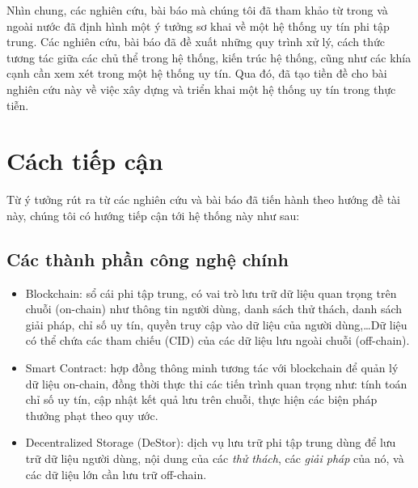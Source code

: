 Nhìn chung, các nghiên cứu, bài báo mà chúng tôi đã tham khảo từ trong và ngoài nước đã định hình một ý tưởng sơ khai về một hệ thống uy tín phi tập trung. Các nghiên cứu, bài báo đã đề xuất những quy trình xử lý, cách thức tương tác giữa các chủ thể trong hệ thống, kiến trúc hệ thống, cũng như các khía cạnh cần xem xét trong một hệ thống uy tín. Qua đó, đã tạo tiền đề cho bài nghiên cứu này về việc xây dựng và triển khai một hệ thống uy tín trong thực tiễn.

\section{Cách tiếp cận}

Từ ý tưởng rút ra từ các nghiên cứu và bài báo đã tiến hành theo hướng đề tài này, chúng tôi có hướng tiếp cận tới hệ thống này như sau:

\subsection{Các thành phần công nghệ chính}
\begin{itemize}
  \item Blockchain: sổ cái phi tập trung, có vai trò lưu trữ dữ liệu quan trọng trên chuỗi (on-chain) như thông tin người dùng, danh sách thử thách, danh sách giải pháp, chỉ số uy tín, quyền truy cập vào dữ liệu của người dùng,\dots Dữ liệu có thể chứa các tham chiếu (CID) của các dữ liệu lưu ngoài chuỗi (off-chain).
  \item Smart Contract: hợp đồng thông minh tương tác với blockchain để quản lý dữ liệu on-chain, đồng thời thực thi các tiến trình quan trọng như: tính toán chỉ số uy tín, cập nhật kết quả lưu trên chuỗi, thực hiện các biện pháp thưởng phạt theo quy ước.
  \item Decentralized Storage (DeStor): dịch vụ lưu trữ phi tập trung dùng để lưu trữ dữ liệu người dùng, nội dung của các \textit{thử thách}, các \textit{giải pháp} của nó, và các dữ liệu lớn cần lưu trữ off-chain.
\end{itemize}


